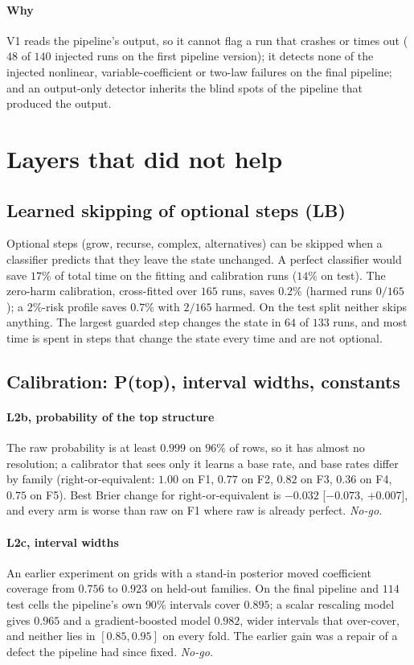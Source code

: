 \paragraph{Why} V1 reads the pipeline's output, so it cannot flag a run that crashes or times out ($48$ of $140$ injected runs on the first
pipeline version); it detects none of the injected nonlinear, variable-coefficient or two-law failures on the final pipeline; and an
output-only detector inherits the blind spots of the pipeline that produced the output.

\section{Layers that did not help}\label{sec:negative}
\subsection{Learned skipping of optional steps (LB)}\label{sec:lb}
Optional steps (grow, recurse, complex, alternatives) can be skipped when a classifier predicts that they leave the state unchanged. A perfect classifier
would save $17\%$ of total time on the fitting and calibration runs ($14\%$ on test). The zero-harm calibration, cross-fitted over $165$ runs, saves $0.2\%$
(harmed runs $0/165$); a $2\%$-risk profile saves $0.7\%$ with $2/165$ harmed. On the test split neither skips anything. The largest guarded step
changes the state in $64$ of $133$ runs, and most time is spent in steps that change the state every time and are not optional.

\subsection{Calibration: P(top), interval widths, constants}\label{sec:calib}
\paragraph{L2b, probability of the top structure} The raw probability is at least $0.999$ on $96\%$ of rows, so it has almost no resolution; a calibrator that sees only it learns a base rate,
and base rates differ by family (right-or-equivalent: $1.00$ on F1, $0.77$ on F2, $0.82$ on F3, $0.36$ on F4, $0.75$ on F5). Best Brier change for
right-or-equivalent is $-0.032$ [$-0.073$, $+0.007$], and every arm is worse than raw on F1 where raw is already perfect. \emph{No-go.}
\paragraph{L2c, interval widths} An earlier experiment on grids with a stand-in posterior moved coefficient coverage from $0.756$ to $0.923$ on held-out families.
On the final pipeline and $114$ test cells the pipeline's own $90\%$ intervals cover $0.895$; a scalar rescaling model gives $0.965$ and a gradient-boosted model $0.982$,
wider intervals that over-cover, and neither lies in $[0.85,0.95]$ on every fold. The earlier gain was a repair of a defect the pipeline had since fixed. \emph{No-go.}
